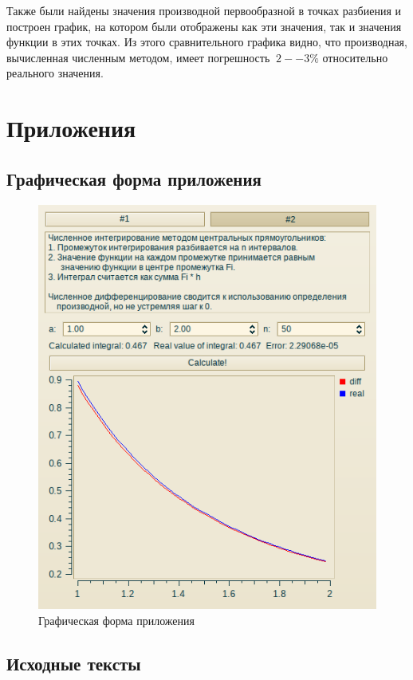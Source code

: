 \documentclass[a4paper,12pt,notitlepage,headsepline,pdftex]{scrartcl}
\begin{document}
  Также были найдены значения производной первообразной в точках разбиения и
  построен график, на котором были отображены как эти значения, так и значения
  функции в этих точках.
  Из этого сравнительного графика видно, что производная, вычисленная
  численным методом, имеет погрешность $~2--3\%$ относительно реального
  значения.
  \newpage
\section{Приложения}
  \subsection{Графическая форма приложения}
    \begin{figure}[h!]
      \begin{center}
        \includegraphics[scale=0.86]{scr.png}
      \end{center}
      \caption{Графическая форма приложения}
      \label{fig:gui}
    \end{figure}
  \subsection{Исходные тексты}
\end{document}
